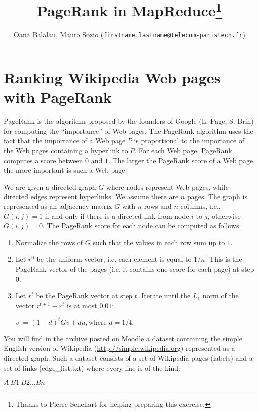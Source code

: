 \documentclass[pdftex,a4paper,DIV15]{scrartcl}
\title{
PageRank in MapReduce\footnote{Thanks to Pierre Senellart for helping preparing this exercise.}}
\author{Oana Balalau, Mauro Sozio (\texttt{firstname.lastname@telecom-paristech.fr})}
\begin{document}
\maketitle



\section*{Ranking Wikipedia Web pages with PageRank }

PageRank is the algorithm proposed by the founders of Google (L. Page, S. Brin)
for computing the ``importance'' of Web pages. The PageRank algorithm uses the fact that
 the importance of a Web page $P$ is proportional to the importance of the Web pages
containing a hyperlink to $P$. For each Web page, PageRank computes a score between $0$ and $1$.
The larger the PageRank score of a Web page, the more important is such a Web page. 

We are given a directed graph $G$ where nodes represent Web pages, while directed edges represent
hyperlinks. We assume there are $n$ pages. The graph is represented as an adjacency matrix $G$ with $n$ rows and $n$ columns, i.e., $G(i,j)=1$ if and only if there is a directed link from node $i$ to $j$, otherwise $G(i,j)=0$. The PageRank score for each node can be computed as follows:

\begin{enumerate}
\item Normalize the rows of $G$ such that the values in each row sum up to $1$.
\item Let $r^0$ be the uniform vector, i.e. each element is equal to $1/n$. This is the PageRank vector of the pages (i.e. it contains one score for each page) at step $0$.
\item Let $r^t$ be the PageRank vector  at step $t$. Iterate until the $L_1$ norm of the vector $r^{t+1} -r^t$ is at most $0.01$:

$
v := (1-d)^tGv + du, \textrm{where } d=1/4. 
$

\end{enumerate}

You will find in the archive posted on Moodle a dataset containing the simple English version of Wikipedia (\url{http://simple.wikipedia.org}) represented as a directed graph. Such a dataset consists of a set of Wikipedia pages (labels) and a set of links (edge\_list.txt) where every line is of the kind:

$A\ B1\ B2 \dots Bn$
\end{document}
